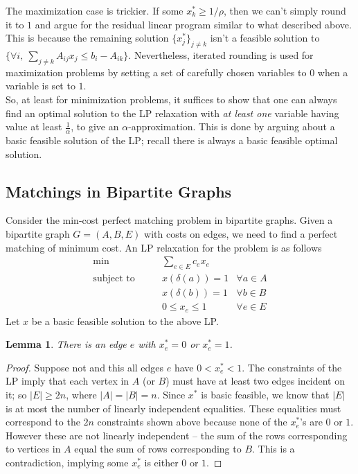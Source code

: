 \documentclass[11pt]{article}
\newtheorem{lemma}{Lemma}
\begin{document}
\noindent
The maximization case is trickier. If some $x^*_k \ge 1/\rho$, then we can't simply round it to $1$ and argue for the residual linear program similar to what described above. This is because the remaining solution $\{x^*_j\}_{j\neq k}$ isn't a feasible solution to  $\{\forall i, ~\sum_{j\neq k} A_{ij}x_j \le b_i - A_{ik}\}$. 
Nevertheless, iterated rounding is used for maximization problems by setting a set of carefully chosen variables to $0$ when a variable is set to $1$.\\

\noindent
So, at least for minimization problems, it suffices to show that one can always find an optimal solution to the LP relaxation with {\em at least one} variable having value at least $\frac{1}{\alpha}$, to give an $\alpha$-approximation. This is done by arguing about a  basic feasible solution of the LP; recall there is always a basic feasible optimal solution.

 
\subsection*{Matchings in Bipartite Graphs}
Consider the min-cost perfect matching problem in bipartite graphs. Given a bipartite graph $G=(A,B,E)$
with costs on edges, we need to find a perfect matching of minimum cost. An LP relaxation for the problem is as follows
\begin{align*}
\min &\qquad \sum_{e\in E} c_ex_e & \\
\textrm{subject to} 	&\qquad x(\delta(a)) = 1 & \forall a\in A \\
				&\qquad x(\delta(b)) = 1 & \forall b\in B \\
				&\qquad 0\le x_e \le 1 & \forall e\in E				
\end{align*}
Let $x$ be a basic feasible solution to the above LP. 
\begin{lemma}
There is an edge $e$ with $x^*_e = 0$ or $x^*_e = 1$.
\end{lemma}
\begin{proof}
Suppose not and this all edges $e$ have  $0< x^*_e < 1$. 
The constraints of the LP imply that each vertex in $A$ (or $B$)
must have at least two edges incident on it; so $|E| \ge 2n$, where $|A| = |B| = n$.
Since $x^*$ is basic feasible, we know that $|E|$ is at most the number of linearly independent equalities.
These equalities must correspond to the $2n$ constraints shown above because none of the $x^*_e$'s are $0$ or $1$. However these are not linearly independent -- the sum of the rows corresponding to vertices in $A$ equal the sum of rows corresponding to $B$. This is a contradiction, implying some $x^*_e$ is either $0$ or $1$.
\end{proof}
\end{document}

